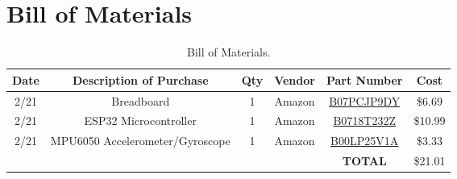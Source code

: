\chapter{Bill of Materials}
\label{chap:bom}

\begin{table}[H]
  \centering
  \begin{tabular}{|c|c|c|c|c|c|}\hline
    Date & Description of Purchase & Qty & Vendor & Part Number & Cost\\\hline\hline
    2/21 & Breadboard & 1 & Amazon & \href{https://www.amazon.com/Pcs-MCIGICM-Points-Solderless-Breadboard/dp/B07PCJP9DY/}{B07PCJP9DY}
                                                                & \$6.69\\\hline
    2/21 & ESP32 Microcontroller & 1 & Amazon & \href{https://www.amazon.com/HiLetgo-ESP-WROOM-32-Development-Microcontroller-Integrated/dp/B0718T232Z/}{B0718T232Z}
                                                                & \$10.99\\\hline
    2/21 & MPU6050 Accelerometer/Gyroscope & 1 & Amazon & \href{https://www.amazon.com/HiLetgo-MPU-6050-Accelerometer-Gyroscope-Converter/dp/B00LP25V1A/}{B00LP25V1A}
                                                                & \$3.33\\\hline\hline
         & & & & \textbf{TOTAL} & \$21.01\\\hline
  \end{tabular}
  
  \caption{Bill of Materials.}
\end{table}


